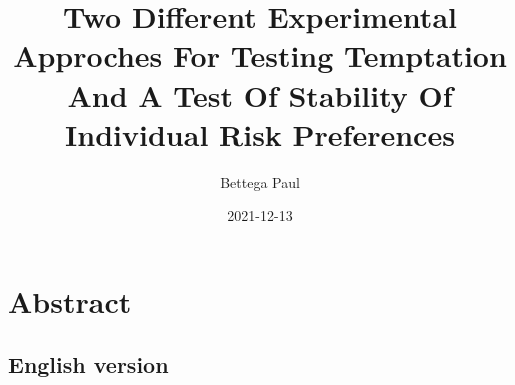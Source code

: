 \documentclass[
]{book}
\title{Two Different Experimental Approches For Testing Temptation And A Test Of Stability Of Individual Risk Preferences}
\author{Bettega Paul}
\date{2021-12-13}
\begin{document}
\maketitle

{
\setcounter{tocdepth}{1}
\tableofcontents
}
\hypertarget{abstract}{%
\chapter*{Abstract}\label{abstract}}

\hypertarget{english-version}{%
\section*{English version}\label{english-version}}
\end{document}
